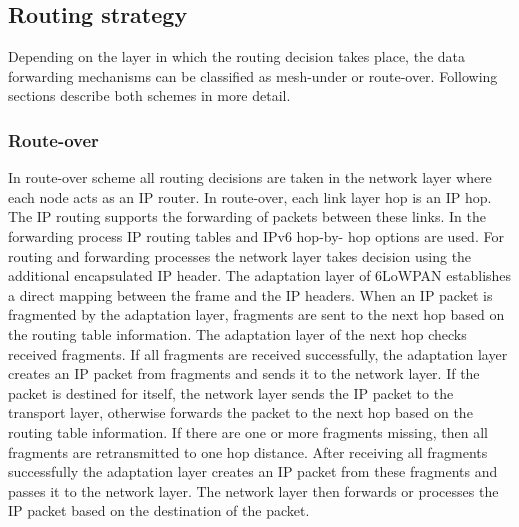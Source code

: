 \documentclass[11pt,draftclsnofoot,onecolumn]{IEEEtran}
\begin{document}
\subsection{Routing strategy}
Depending on the layer in which the routing decision takes place, the data forwarding mechanisms can be classified as mesh-under or route-over. Following sections describe both schemes in more detail.

\subsubsection{Route-over}
In route-over scheme all routing decisions are taken in the network layer where each node acts as an IP router. In route-over, each link layer hop is an IP hop. The IP routing supports the forwarding of packets between these links. In the forwarding process IP routing tables and IPv6 hop-by- hop options are used. For routing and forwarding processes the network layer takes decision using the additional encapsulated IP header. The adaptation layer of 6LoWPAN establishes a direct mapping between the frame and the IP headers. When an IP packet is fragmented by the adaptation layer, fragments are sent to the next hop based on the routing table information. The adaptation layer of the next hop checks received fragments. If all fragments are received successfully, the adaptation layer creates an IP packet from fragments and sends it to the network layer. If the packet is destined for itself, the network layer sends the IP packet to the transport layer, otherwise forwards the packet to the next hop based on the routing table information. If there are one or more fragments missing, then all fragments are retransmitted to one hop distance. After receiving all fragments successfully the adaptation layer creates an IP packet from these fragments and passes it to the network layer. The network layer then forwards or processes the IP packet based on the destination of the packet.
\end{document}
